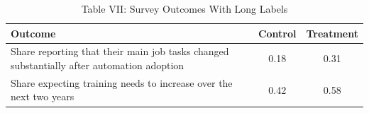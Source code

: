 \begin{table}[htbp]
\centering
\caption{Table VII: Survey Outcomes With Long Labels}
\begin{tabularx}{\textwidth}{Xcc}
\toprule
Outcome & Control & Treatment \\
\midrule
Share reporting that their main job tasks changed substantially after automation adoption & 0.18 & 0.31 \\
Share expecting training needs to increase over the next two years & 0.42 & 0.58 \\
\bottomrule
\end{tabularx}
\end{table}
